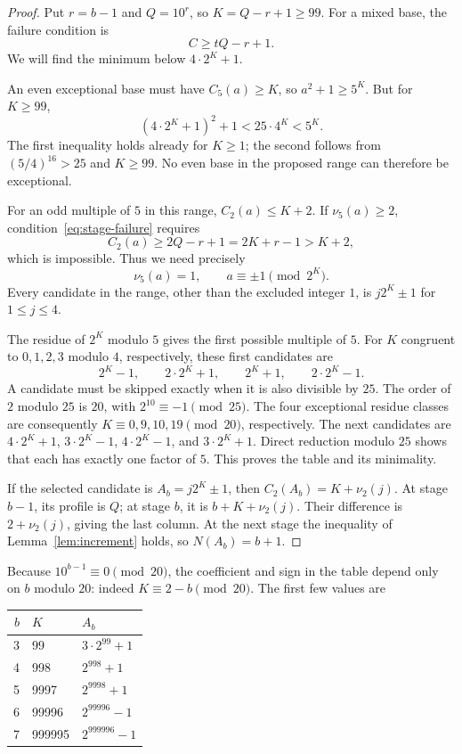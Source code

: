 \documentclass[11pt,a4paper]{article}
\theoremstyle{definition}
\begin{document}
\begin{proof}
Put $r=b-1$ and $Q=10^r$, so $K=Q-r+1\ge99$.
For a mixed base, the failure condition is
\begin{equation}\label{eq:stage-failure}
C\ge tQ-r+1.
\end{equation}
We will find the minimum below $4\cdot2^K+1$.

An even exceptional base must have $C_5(a)\ge K$, so
$a^2+1\ge5^K$. But for $K\ge99$,
\[
(4\cdot2^K+1)^2+1<25\cdot4^K<5^K.
\]
The first inequality holds already for $K\ge1$; the second follows from
$(5/4)^{16}>25$ and $K\ge99$. No even base in the proposed range can
therefore be exceptional.

For an odd multiple of $5$ in this range, $C_2(a)\le K+2$.
If $\nu_5(a)\ge2$, condition~\eqref{eq:stage-failure} requires
\[
C_2(a)\ge2Q-r+1=2K+r-1>K+2,
\]
which is impossible. Thus we need precisely
\begin{equation}\label{eq:min-conditions}
\nu_5(a)=1,\qquad a\equiv\pm1\pmod{2^K}.
\end{equation}
Every candidate in the range, other than the excluded integer $1$, is
$j2^K\pm1$ for $1\le j\le4$.

The residue of $2^K$ modulo $5$ gives the first possible multiple of $5$.
For $K$ congruent to $0,1,2,3$ modulo $4$, respectively, these first
candidates are
\[
2^K-1,\qquad 2\cdot2^K+1,\qquad
2^K+1,\qquad 2\cdot2^K-1.
\]
A candidate must be skipped exactly when it is also divisible by $25$.
The order of $2$ modulo $25$ is $20$, with $2^{10}\equiv-1\pmod{25}$.
The four exceptional residue classes are consequently
$K\equiv0,9,10,19\pmod{20}$, respectively. The next candidates are
$4\cdot2^K+1$, $3\cdot2^K-1$, $4\cdot2^K-1$, and $3\cdot2^K+1$.
Direct reduction modulo $25$ shows that each has exactly one factor of $5$.
This proves the table and its minimality.

If the selected candidate is $A_b=j2^K\pm1$, then
$C_2(A_b)=K+\nu_2(j)$. At stage $b-1$, its profile is $Q$; at stage $b$,
it is $b+K+\nu_2(j)$. Their difference is
$2+\nu_2(j)$, giving the last column.
At the next stage the inequality of Lemma~\ref{lem:increment} holds, so
$N(A_b)=b+1$.
\end{proof}

Because $10^{b-1}\equiv0\pmod{20}$, the coefficient and sign in the table
depend only on $b$ modulo $20$: indeed $K\equiv2-b\pmod{20}$.
The first few values are
\begin{center}
\begin{tabular}{rll}
\toprule
$b$ & $K$ & $A_b$\\
\midrule
3 & 99 & $3\cdot2^{99}+1$\\
4 & 998 & $2^{998}+1$\\
5 & 9997 & $2^{9998}+1$\\
6 & 99996 & $2^{99996}-1$\\
7 & 999995 & $2^{999996}-1$\\
\bottomrule
\end{tabular}
\end{center}
\end{document}
